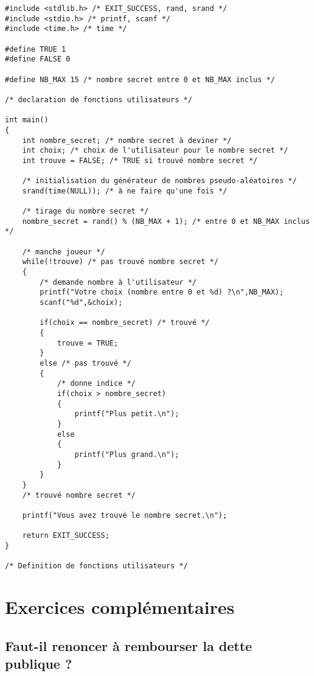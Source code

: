 \begin{correction}
\begin{verbatim}
#include <stdlib.h> /* EXIT_SUCCESS, rand, srand */
#include <stdio.h> /* printf, scanf */
#include <time.h> /* time */

#define TRUE 1
#define FALSE 0

#define NB_MAX 15 /* nombre secret entre 0 et NB_MAX inclus */

/* declaration de fonctions utilisateurs */

int main()
{
    int nombre_secret; /* nombre secret à deviner */
    int choix; /* choix de l'utilisateur pour le nombre secret */
    int trouve = FALSE; /* TRUE si trouvé nombre secret */

    /* initialisation du générateur de nombres pseudo-aléatoires */
    srand(time(NULL)); /* à ne faire qu'une fois */

    /* tirage du nombre secret */
    nombre_secret = rand() % (NB_MAX + 1); /* entre 0 et NB_MAX inclus */

    /* manche joueur */
    while(!trouve) /* pas trouvé nombre secret */
    {
        /* demande nombre à l'utilisateur */
        printf("Votre choix (nombre entre 0 et %d) ?\n",NB_MAX);
        scanf("%d",&choix);
        
        if(choix == nombre_secret) /* trouvé */
        {
            trouve = TRUE;
        }
        else /* pas trouvé */
        {
            /* donne indice */
            if(choix > nombre_secret)
            {
                printf("Plus petit.\n");
            }
            else
            {
                printf("Plus grand.\n");
            }
        }
    }
    /* trouvé nombre secret */

    printf("Vous avez trouvé le nombre secret.\n");

    return EXIT_SUCCESS;
}

/* Definition de fonctions utilisateurs */
\end{verbatim}
\end{correction}


\section{Exercices complémentaires}

\subsection{Faut-il renoncer à rembourser la dette publique ?}

